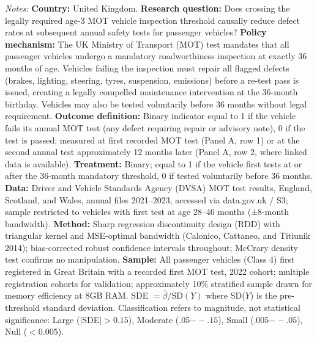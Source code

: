 \begin{table}[htbp]
\begin{threeparttable}
\begin{tablenotes}
\item {\footnotesize \textit{Notes:} \textbf{Country:} United Kingdom. \textbf{Research question:} Does crossing the legally required age-3 MOT vehicle inspection threshold causally reduce defect rates at subsequent annual safety tests for passenger vehicles? \textbf{Policy mechanism:} The UK Ministry of Transport (MOT) test mandates that all passenger vehicles undergo a mandatory roadworthiness inspection at exactly 36 months of age. Vehicles failing the inspection must repair all flagged defects (brakes, lighting, steering, tyres, suspension, emissions) before a re-test pass is issued, creating a legally compelled maintenance intervention at the 36-month birthday. Vehicles may also be tested voluntarily before 36 months without legal requirement. \textbf{Outcome definition:} Binary indicator equal to 1 if the vehicle fails its annual MOT test (any defect requiring repair or advisory note), 0 if the test is passed; measured at first recorded MOT test (Panel A, row 1) or at the second annual test approximately 12 months later (Panel A, row 2, where linked data is available). \textbf{Treatment:} Binary; equal to 1 if the vehicle first tests at or after the 36-month mandatory threshold, 0 if tested voluntarily before 36 months. \textbf{Data:} Driver and Vehicle Standards Agency (DVSA) MOT test results, England, Scotland, and Wales, annual files 2021--2023, accessed via data.gov.uk / S3; sample restricted to vehicles with first test at age 28--46 months (±8-month bandwidth). \textbf{Method:} Sharp regression discontinuity design (RDD) with triangular kernel and MSE-optimal bandwidth (Calonico, Cattaneo, and Titiunik 2014); bias-corrected robust confidence intervals throughout; McCrary density test confirms no manipulation. \textbf{Sample:} All passenger vehicles (Class 4) first registered in Great Britain with a recorded first MOT test, 2022 cohort; multiple registration cohorts for validation; approximately 10\% stratified sample drawn for memory efficiency at 8GB RAM. SDE $= \hat{\beta} / \text{SD}(Y)$ where SD($Y$) is the pre-threshold standard deviation. Classification refers to magnitude, not statistical significance: Large ($|$SDE$| > 0.15$), Moderate (.05$--.15$), Small (.005$--.05$), Null ($< 0.005$).}
\end{tablenotes}
\end{threeparttable}
\end{table}


